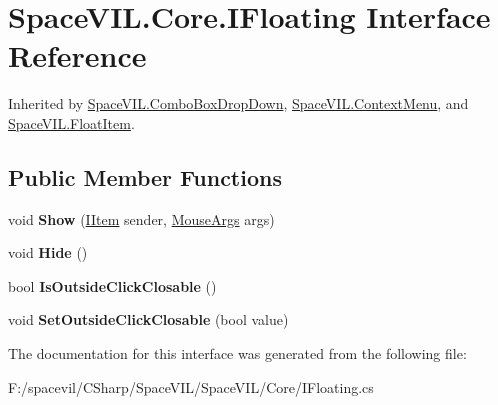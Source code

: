 \hypertarget{interface_space_v_i_l_1_1_core_1_1_i_floating}{}\section{Space\+V\+I\+L.\+Core.\+I\+Floating Interface Reference}
\label{interface_space_v_i_l_1_1_core_1_1_i_floating}


Inherited by \mbox{\hyperlink{class_space_v_i_l_1_1_combo_box_drop_down}{Space\+V\+I\+L.\+Combo\+Box\+Drop\+Down}}, \mbox{\hyperlink{class_space_v_i_l_1_1_context_menu}{Space\+V\+I\+L.\+Context\+Menu}}, and \mbox{\hyperlink{class_space_v_i_l_1_1_float_item}{Space\+V\+I\+L.\+Float\+Item}}.

\subsection*{Public Member Functions}
\begin{DoxyCompactItemize}
\item 
\mbox{\label{interface_space_v_i_l_1_1_core_1_1_i_floating_a71315141109b37b0112fc9da3daa8078}} 
void {\bfseries Show} (\mbox{\hyperlink{interface_space_v_i_l_1_1_core_1_1_i_item}{I\+Item}} sender, \mbox{\hyperlink{class_space_v_i_l_1_1_core_1_1_mouse_args}{Mouse\+Args}} args)
\item 
\mbox{\label{interface_space_v_i_l_1_1_core_1_1_i_floating_acab7554a70314060a948d87259d2f6d5}} 
void {\bfseries Hide} ()
\item 
\mbox{\label{interface_space_v_i_l_1_1_core_1_1_i_floating_a8d016f661d0688f4f46334e4e8a8f286}} 
bool {\bfseries Is\+Outside\+Click\+Closable} ()
\item 
\mbox{\label{interface_space_v_i_l_1_1_core_1_1_i_floating_a9c7e51e01c96a82e7f5825986382b017}} 
void {\bfseries Set\+Outside\+Click\+Closable} (bool value)
\end{DoxyCompactItemize}


The documentation for this interface was generated from the following file\+:\begin{DoxyCompactItemize}
\item 
F\+:/spacevil/\+C\+Sharp/\+Space\+V\+I\+L/\+Space\+V\+I\+L/\+Core/I\+Floating.\+cs\end{DoxyCompactItemize}
